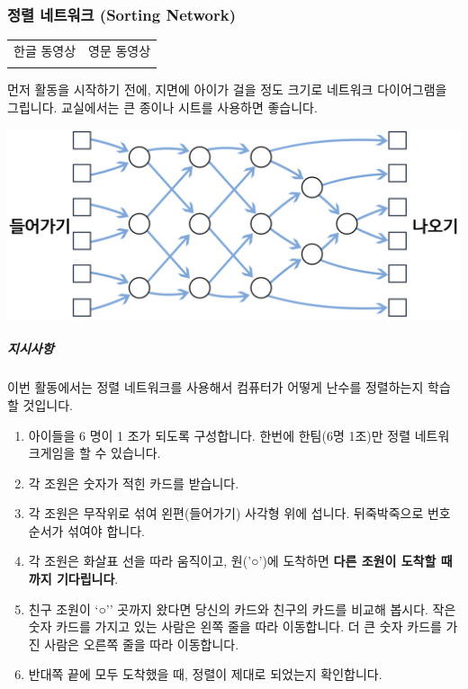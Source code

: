 \documentclass[]{article}
\begin{document}
\subsubsection{정렬 네트워크 (Sorting Network)}\label{sorting-network}

\begin{longtable}[c]{@{}ll@{}}
\toprule
\begin{minipage}[t]{0.47\columnwidth}\raggedright\strut
한글 동영상
\strut\end{minipage} &
\begin{minipage}[t]{0.47\columnwidth}\raggedright\strut
영문 동영상
\strut\end{minipage}\tabularnewline
\begin{minipage}[t]{0.47\columnwidth}\raggedright\strut
\strut\end{minipage} &
\begin{minipage}[t]{0.47\columnwidth}\raggedright\strut
\strut\end{minipage}\tabularnewline
\bottomrule
\end{longtable}

먼저 활동을 시작하기 전에, 지면에 아이가 걸을 정도 크기로 네트워크
다이어그램을 그립니다. 교실에서는 큰 종이나 시트를 사용하면 좋습니다.

\includegraphics{csunplugged/02-part/img/ch08-parallel/08-parallel-01-activity.png}

\subparagraph{지시사항}\label{section-117}

이번 활동에서는 정렬 네트워크를 사용해서 컴퓨터가 어떻게 난수를
정렬하는지 학습할 것입니다.

\begin{enumerate}
\itemsep1pt\parskip0pt
\item
  아이들을 6 명이 1 조가 되도록 구성합니다. 한번에 한팀(6명 1조)만 정렬
  네트워크게임을 할 수 있습니다.
\item
  각 조원은 숫자가 적힌 카드를 받습니다.
\item
  각 조원은 무작위로 섞여 왼편(들어가기) 사각형 위에 섭니다.
  뒤죽박죽으로 번호 순서가 섞여야 합니다.
\item
  각 조원은 화살표 선을 따라 움직이고, 원('○')에 도착하면 \textbf{다른
  조원이 도착할 때까지 기다립니다}.
\item
  친구 조원이 `○'' 곳까지 왔다면 당신의 카드와 친구의 카드를 비교해
  봅시다. 작은 숫자 카드를 가지고 있는 사람은 왼쪽 줄을 따라 이동합니다.
  더 큰 숫자 카드를 가진 사람은 오른쪽 줄을 따라 이동합니다.
\item
  반대쪽 끝에 모두 도착했을 때, 정렬이 제대로 되었는지 확인합니다.
\end{enumerate}
\end{document}

